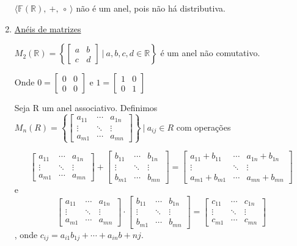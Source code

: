 \documentclass[12pt]{book}
\begin{document}
\begin{enumerate}
  $\langle\mathbb{F}(\mathbb{R}), \ +, \ \circ \ \rangle$ não é um anel, pois não há distributiva.


\item \underline{Anéis de matrizes}
  
  $M_2(\mathbb{R}) = \left\{\begin{bmatrix}
      a & b \\
      c & d 
    \end{bmatrix} \ | \ a,b,c,d \in \mathbb{R}\right\}$ é um anel não comutativo. 
  
  Onde $0 = \begin{bmatrix}
    0 & 0 \\ 0 & 0
  \end{bmatrix}$ e $1 = \begin{bmatrix}
    1 & 0 \\ 0 & 1
  \end{bmatrix}$

  Seja R um anel associativo. Definimos $M_n(R) = \left\{\begin{bmatrix}
      a_{11} & \cdots & a_{1n} \\
      \vdots & \ddots & \vdots \\
      a_{m1} & \cdots & a_{mn}
    \end{bmatrix}\right\} \ | \ a_{ij}\in R$ com operações

  $$\begin{bmatrix}
    a_{11} & \cdots & a_{1n} \\
    \vdots & \ddots & \vdots \\
    a_{m1} & \cdots & a_{mn}
  \end{bmatrix} + 
  \begin{bmatrix}
    b_{11} & \cdots & b_{1n} \\
    \vdots & \ddots & \vdots \\
    b_{m1} & \cdots & b_{mn}
  \end{bmatrix} = \begin{bmatrix}
    a_{11} + b_{11} & \cdots & a_{1n} + b_{1n}\\
    \vdots & \ddots & \vdots \\
    a_{m1} + b_{m1} & \cdots & a_{mn} + b_{mn}
  \end{bmatrix}$$ e
  $$\begin{bmatrix}
    a_{11} & \cdots & a_{1n} \\
    \vdots & \ddots & \vdots \\
    a_{m1} & \cdots & a_{mn}
  \end{bmatrix} \cdot \begin{bmatrix}
    b_{11} & \cdots & b_{1n} \\
    \vdots & \ddots & \vdots \\
    b_{m1} & \cdots & b_{mn}
  \end{bmatrix} = \begin{bmatrix}
    c_{11} & \cdots & c_{1n} \\
    \vdots & \ddots & \vdots \\
    c_{m1} & \cdots & c_{mn}
  \end{bmatrix}
  $$ , onde $c_{ij} = a_{i1}b_{1j} + \cdots + a_{in}b+nj$.


\end{enumerate}
\end{document}

